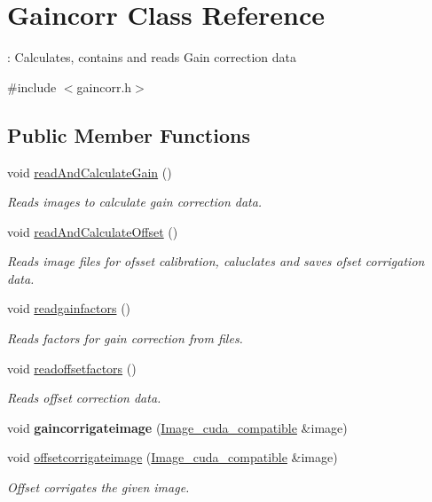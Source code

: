 \hypertarget{classGaincorr}{}\section{Gaincorr Class Reference}
\label{classGaincorr}


\+: Calculates, contains and reads Gain correction data  




{\ttfamily \#include $<$gaincorr.\+h$>$}

\subsection*{Public Member Functions}
\begin{DoxyCompactItemize}
\item 
void \hyperlink{classGaincorr_a5751ca7bcc7dca8b298558c65b5fcd50}{read\+And\+Calculate\+Gain} ()
\begin{DoxyCompactList}\small\item\em Reads images to calculate gain correction data. \end{DoxyCompactList}\item 
void \hyperlink{classGaincorr_adae369206efa5a41806749162051b7a9}{read\+And\+Calculate\+Offset} ()
\begin{DoxyCompactList}\small\item\em Reads image files for ofsset calibration, caluclates and saves ofset corrigation data. \end{DoxyCompactList}\item 
void \hyperlink{classGaincorr_abda7eed0445b5590b0dfafd3ca4f58ec}{readgainfactors} ()
\begin{DoxyCompactList}\small\item\em Reads factors for gain correction from files. \end{DoxyCompactList}\item 
void \hyperlink{classGaincorr_af4413aa4ff1c30952e3e3feb30b0beb4}{readoffsetfactors} ()
\begin{DoxyCompactList}\small\item\em Reads offset correction data. \end{DoxyCompactList}\item 
void {\bfseries gaincorrigateimage} (\hyperlink{classImage__cuda__compatible}{Image\+\_\+cuda\+\_\+compatible} \&image)\hypertarget{classGaincorr_a792a26c354754272b251f8c70ca27728}{}\label{classGaincorr_a792a26c354754272b251f8c70ca27728}

\item 
void \hyperlink{classGaincorr_a85f655120337216bb93e18de5807bc11}{offsetcorrigateimage} (\hyperlink{classImage__cuda__compatible}{Image\+\_\+cuda\+\_\+compatible} \&image)
\begin{DoxyCompactList}\small\item\em Offset corrigates the given image. \end{DoxyCompactList}\end{DoxyCompactItemize}


